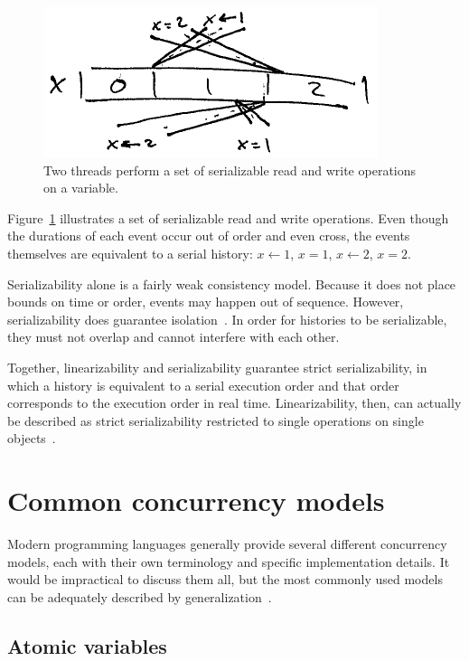 \documentclass{sig-alternate}
\begin{document}
\begin{figure}[h]
  \centering
  \includegraphics{serializability}
  \caption{Two threads perform a set of serializable read and write operations on a variable.}
\label{figure:serializability}
\end{figure}

Figure~\ref{figure:serializability} illustrates a set of serializable read and write operations. Even though the durations of each event occur out of order and even cross, the events themselves are equivalent to a serial history: $x \leftarrow 1$, $x = 1$, $x \leftarrow 2$, $x = 2$.

Serializability alone is a fairly weak consistency model. Because it does not place bounds on time or order, events may happen out of sequence. However, serializability does guarantee isolation~\cite{Haerder1983}. In order for histories to be serializable, they must not overlap and cannot interfere with each other.

Together, linearizability and serializability guarantee strict serializability, in which a history is equivalent to a serial execution order and that order corresponds to the execution order in real time. Linearizability, then, can actually be described as strict serializability restricted to single operations on single objects~\cite{Herlihy1990}.

\section{Common concurrency models}

Modern programming languages generally provide several different concurrency models, each with their own terminology and specific implementation details. It would be impractical to discuss them all, but the most commonly used models can be adequately described by generalization~\cite{Swalens2014}.

\subsection{Atomic variables}
\end{document}
